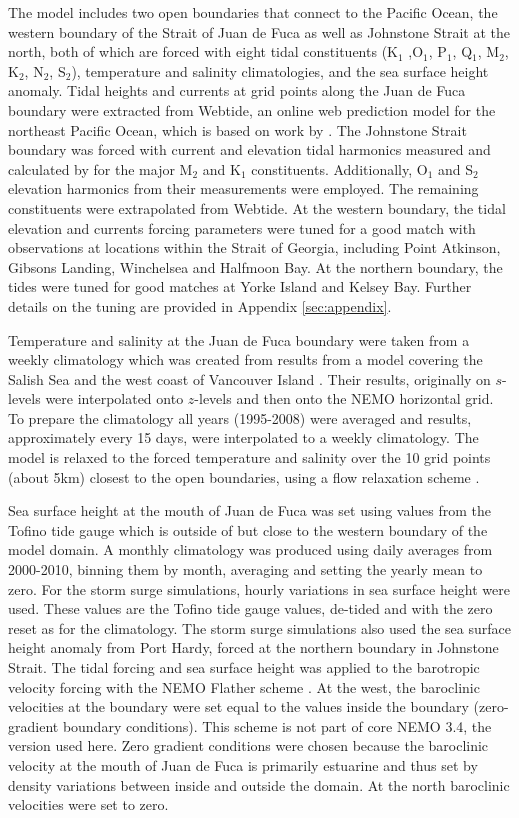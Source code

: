 \documentclass[pdftex,10pt]{article}
\begin{document}
The model includes two open boundaries that connect to the Pacific Ocean, the western boundary of the Strait of Juan de Fuca as well as Johnstone Strait at the north, both of which are forced with eight tidal constituents (K$_1$ ,O$_1$, P$_1$, Q$_1$, M$_2$, K$_2$, N$_2$, S$_2$), temperature and salinity climatologies, and the sea surface height anomaly. Tidal heights and currents at grid points along the Juan de Fuca boundary were extracted from Webtide, an online web prediction model for the northeast Pacific Ocean, which is based on work by \citet{foreman2000webtide}. The Johnstone Strait boundary was forced with current and elevation tidal harmonics measured and calculated by \citet{thomson1980johnstone} for the major M$_2$ and K$_1$ constituents. Additionally, O$_1$ and S$_2$ elevation harmonics from their measurements were employed. The remaining constituents were extrapolated from Webtide. At the western boundary, the tidal elevation and currents forcing parameters were tuned for a good match with observations at locations within the Strait of Georgia, including Point Atkinson, Gibsons Landing, Winchelsea and Halfmoon Bay. At the northern boundary, the tides were tuned for good matches at Yorke Island and Kelsey Bay. Further details on the tuning are provided in Appendix \ref{sec:appendix}. 

Temperature and salinity at the Juan de Fuca boundary were taken from a weekly climatology which was created from results from a model covering the Salish Sea and the west coast of Vancouver Island \citep{massonfine2012}.  Their results, originally on $s$-levels were interpolated onto $z$-levels and then onto the NEMO horizontal grid.  To prepare the climatology all years (1995-2008) were averaged and results, approximately every 15 days, were interpolated to a weekly climatology. The model is relaxed to the forced temperature and salinity over the 10 grid points (about 5km) closest to the open boundaries, using a flow relaxation scheme \citep{engedahl1995use}. %

Sea surface height at the mouth of Juan de Fuca was set using values from the Tofino tide gauge which is outside of but close to the western boundary of the model domain.  A monthly climatology was produced using daily averages from 2000-2010, binning them by month, averaging and setting the yearly mean to zero.  For the storm surge simulations, hourly variations in sea surface height were used.  These values are the Tofino tide gauge values, de-tided and with the zero reset as for the climatology. The storm surge simulations also used the sea surface height anomaly from Port Hardy, forced at the northern boundary in Johnstone Strait. The tidal forcing and sea surface height was applied to the barotropic velocity forcing with the NEMO Flather scheme \citep{flather1994storm, madec2012nemo}. At the west, the baroclinic velocities at the boundary were set equal to the values inside the boundary (zero-gradient boundary conditions).  This scheme is not part of core NEMO 3.4, the version used here.  Zero gradient conditions were chosen because the baroclinic velocity at the mouth of Juan de Fuca is primarily estuarine and thus set by density variations between inside and outside the domain. At the north baroclinic velocities were set to zero. 
\end{document}
